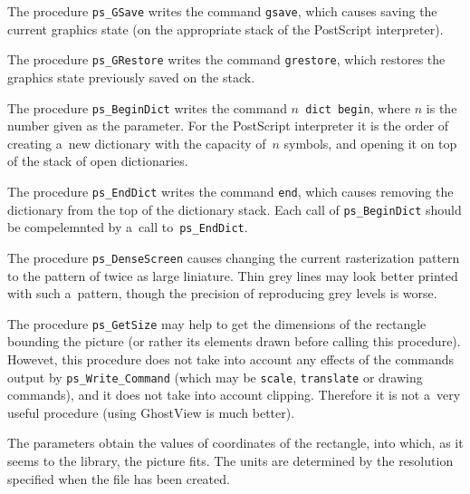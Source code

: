 \vspace{\bigskipamount}
The procedure \texttt{ps\_GSave} writes the command \texttt{gsave}, which causes
saving the current graphics state (on the appropriate stack of the
PostScript interpreter).

The procedure \texttt{ps\_GRestore} writes the command \texttt{grestore}, which
restores the graphics state previously saved on the stack.

\vspace{\bigskipamount}
The procedure \texttt{ps\_BeginDict} writes the command
\texttt{$n$ dict begin}, where $n$ is the number given as the parameter.
For the PostScript interpreter it is the order of creating a~new dictionary
with the capacity of~$n$ symbols, and opening it on top of the stack
of open dictionaries.

The procedure \texttt{ps\_EndDict} writes the command \texttt{end},
which causes removing the dictionary from the top of the dictionary stack.
Each call of \texttt{ps\_BeginDict} should be compelemnted by a~call
to~\texttt{ps\_EndDict}.

\vspace{\bigskipamount}
The procedure \texttt{ps\_DenseScreen} causes changing the current
rasterization pattern to the pattern of twice as large liniature.
Thin grey lines may look better printed with such a~pattern, though
the precision of reproducing grey levels is worse.

\vspace{\bigskipamount}
The procedure \texttt{ps\_GetSize} may help to get the dimensions of the
rectangle bounding the picture (or rather its elements drawn before
calling this procedure). Howevet, this procedure does not take into
account any effects of the commands output by \texttt{ps\_Write\_Command}
(which may be \texttt{scale}, \texttt{translate} or drawing commands),
and it does not take into account clipping. Therefore it is
not a~very useful procedure (using GhostView is much better).

The parameters obtain the values of coordinates of the rectangle,
into which, as it seems to the library, the picture fits.
The units are determined by the resolution specified when the file
has been created.


